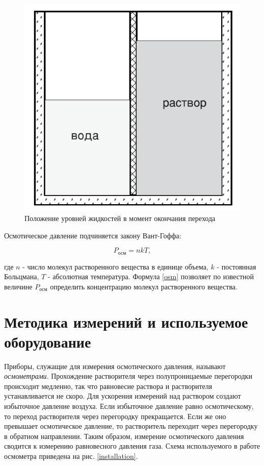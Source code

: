 \documentclass[a4paper, 12pt]{article}
\begin{document}
    \begin{figure}[H]
        \centering
        \includegraphics[scale = 0.5]{images/scheme_theory_eq.png}
        \caption{Положение уровней жидкостей в момент окончания перехода}
        \label{th:osm_eq}
    \end{figure}
    
    \noindent Осмотическое давление подчиняется закону Вант-Гоффа:

    \begin{equation}
        \label{osm}
        P_\text{осм} = nkT,
    \end{equation}

    \noindent где $n$ - число молекул растворенного вещества в единице объема, $k$ - постоянная Больцмана, $T$ - абсолютная температура. Формула \ref{osm} позволяет по известной величине $P_\text{осм}$ определить концентрацию молекул растворенного вещества.
    
    \section{Методика измерений и используемое оборудование}

    \noindent Приборы, служащие для измерения осмотического давления, называют \textit{осмометрами}. Прохождение растворителя через полупроницаемые перегородки происходит медленно, так что равновесие раствора и растворителя устанавливается не скоро. Для ускорения измерений над раствором создают избыточное давление воздуха. Если избыточное давление равно осмотическому, то переход растворителя через перегородку прекращается. Если же оно превышает осмотическое давление, то растворитель переходит через перегородку в обратном направлении. Таким образом, измерение осмотического давления сводится к измерению равновесного давления газа. Схема используемого в работе осмометра приведена на рис. \ref{installation}. 
\end{document}
